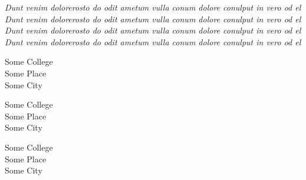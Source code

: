 \documentclass[a4paper,10pt]{article}
\begin{document}
{\itshape\LARGE
  Dunt venim dolorerosto do odit
  ametum vulla conum dolore
  conulput in vero od el
  Dunt venim dolorerosto do odit
  ametum vulla conum dolore
  conulput in vero od el
  Dunt venim dolorerosto do odit
  ametum vulla conum dolore
  conulput in vero od el
  Dunt venim dolorerosto do odit
  ametum vulla conum dolore
  conulput in vero od el\par
}

{\Large {Some College \\ Some Place \\ Some City}} \par

\bigskip
{\Large {Some College \\ Some Place \\ Some City} \par}%

\bigskip
{\Large Some College \\ Some Place \\ Some City \par}
\end{document}
